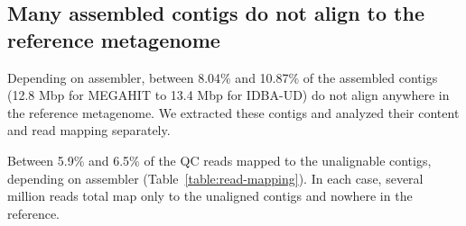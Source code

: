 \documentclass[10pt,a4paper,twocolumn]{article}
\begin{document}


\subsection*{Many assembled contigs do not align to the reference metagenome}

Depending on assembler, between 8.04\% and 10.87\% of the assembled
contigs (12.8 Mbp for MEGAHIT to 13.4 Mbp for IDBA-UD) do not align
anywhere in the reference metagenome.  We extracted these contigs and
analyzed their content and read mapping separately.

Between 5.9\% and 6.5\% of the QC reads mapped to the unalignable
contigs, depending on assembler (Table~\ref{table:read-mapping}).  In
each case, several million reads total map only to the unaligned
contigs and nowhere in the reference.





\end{document}
